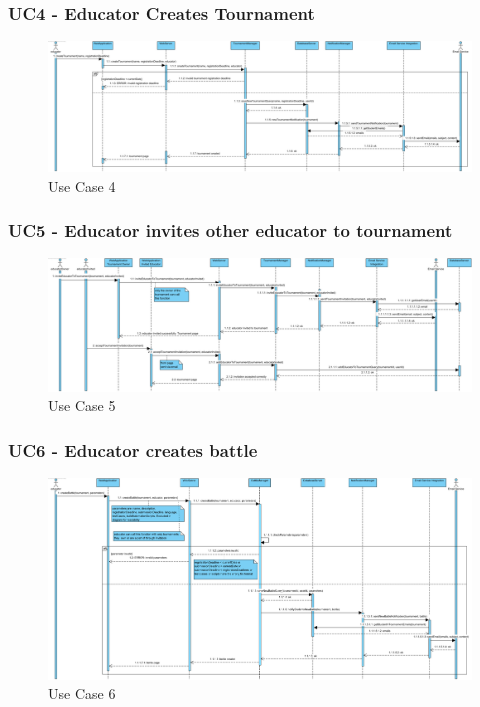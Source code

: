 \documentclass{article}
\begin{document}
\subsubsection*{UC4 - Educator Creates Tournament}

\begin{figure}[H]
    \centering
    \includegraphics[width=1\textwidth]{images/UseCaseSequenceDiagrams/UC4}
    \caption{Use Case 4}
    \label{fig:UC4}
\end{figure}

\subsubsection*{UC5 - Educator invites other educator to tournament}

\begin{figure}[H]
    \centering
    \includegraphics[width=1\textwidth]{images/UseCaseSequenceDiagrams/UC5}
    \caption{Use Case 5}
    \label{fig:UC5}
\end{figure}

\subsubsection*{UC6 - Educator creates battle}

\begin{figure}[H]
    \centering
    \includegraphics[width=1\textwidth]{images/UseCaseSequenceDiagrams/UC6}
    \caption{Use Case 6}
    \label{fig:UC6}
\end{figure}
\end{document}
